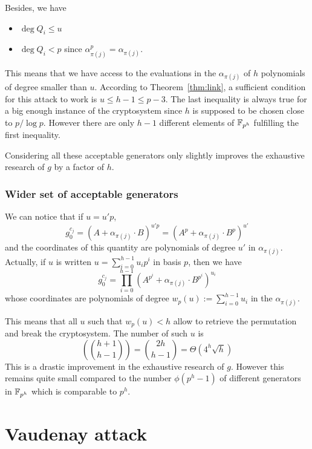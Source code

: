 \documentclass[a4paper]{article}
\newcommand{\GF}[1]{\F_{#1}}
\begin{document}
Besides, we have
\begin{itemize}
\item $\deg Q_i \leq u$
\item $\deg Q_i < p$ since $\alpha_{\pi(j)}^p = \alpha_{\pi(j)}$.
\end{itemize}

This means that we have access to the evaluations in the $\alpha_{\pi(j)}$ of $h$ polynomials of degree smaller than $u$. According to Theorem~\ref{thm:link}, a sufficient condition for this attack to work is $u \leq h-1 \leq p-3$. The last inequality is  always true for a big enough instance of the cryptosystem since $h$ is supposed to be chosen close to $p / \log p$. However there are only $h-1$ different elements of $\GF{p^h}$ fulfilling the first inequality.

Considering all these acceptable generators only slightly improves the exhaustive research of $g$ by a factor of $h$.


\subsubsection{Wider set of acceptable generators}

We can notice that if $u = u'p$,
$$ g_0^{c_j} = (A + \alpha_{\pi(j)} \cdot B)^{u'p} = (A^p + \alpha_{\pi(j)} \cdot B^p)^{u'} $$
and the coordinates of this quantity are polynomials of degree $u'$ in $\alpha_{\pi(j)}$.
Actually, if $u$ is written $u = \sum_{i=0}^{h-1} u_i p^i$ in basis $p$, then we have
$$ g_0^{c_j} = \prod_{i=0}^{h-1} (A^{p^i} + \alpha_{\pi(j)} \cdot B^{p^i} )^{u_i} $$
whose coordinates are polynomials of degree $w_p(u) := \sum_{i=0}^{h-1} u_i$ in the $\alpha_{\pi(j)}$.

This means that all $u$ such that $w_p(u) < h$ allow to retrieve the permutation and break the cryptosystem.
The number of such $u$ is
$$ \left( \binom{h+1}{h-1} \right) = \binom{2h}{h-1} =\Theta\left( 4^h \sqrt{h} \right) $$
This is a drastic improvement in the exhaustive research of $g$. However this remains quite small compared to the number $\phi(p^h-1)$ of different generators in $\GF{p^h}$ which is comparable to $p^h$.




\newpage
\section{Vaudenay attack}
\label{sec:Vau}
\end{document}
